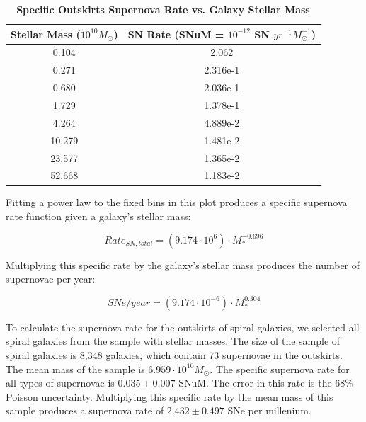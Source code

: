 \documentclass[apj]{emulateapj}
\begin{document}
\begin{table}

\begin{center}

  \caption{\textbf{Specific Outskirts Supernova Rate vs. Galaxy Stellar Mass}}	
  
  \begin{tabular}{| c | c |}
  \hline
    Stellar Mass ($10^{10} M_{\odot}$) & SN Rate \newline (SNuM = $10^{-12}$ SN $yr^{-1} M_{\odot}^{-1}$) \\
  \hline
    0.104 & 2.062 \\
    0.271 & 2.316e-1 \\
    0.680 & 2.036e-1 \\
    1.729 & 1.378e-1 \\
    4.264 & 4.889e-2 \\
    10.279 & 1.481e-2 \\
    23.577 & 1.365e-2 \\
    52.668 & 1.183e-2 \\
  \hline
  \end{tabular}
\end{center}

\end{table}

Fitting a power law to the fixed bins in this plot produces a specific supernova rate function given a galaxy's stellar mass:

\begin{equation}
Rate_{SN,total}=(9.174 \cdot 10^6) \cdot M_*^{-0.696}
\end{equation}

Multiplying this specific rate by the galaxy's stellar mass produces the number of supernovae per year:

\begin{equation}
SNe/year=(9.174 \cdot 10^{-6}) \cdot M_*^{0.304}
\end{equation}

To calculate the supernova rate for the outskirts of spiral galaxies, we selected all spiral galaxies from the sample with stellar masses. The size of the sample of spiral galaxies is 8,348 galaxies, which contain 73 supernovae in the outskirts. The mean mass of the sample is $6.959 \cdot 10^{10} M_{\odot}$. The specific supernova rate for all types of supernovae is $0.035 \pm 0.007$ SNuM. The error in this rate is the 68\% Poisson uncertainty. Multiplying this specific rate by the mean mass of this sample produces a supernova rate of $2.432 \pm 0.497$ SNe per millenium.
\end{document}
